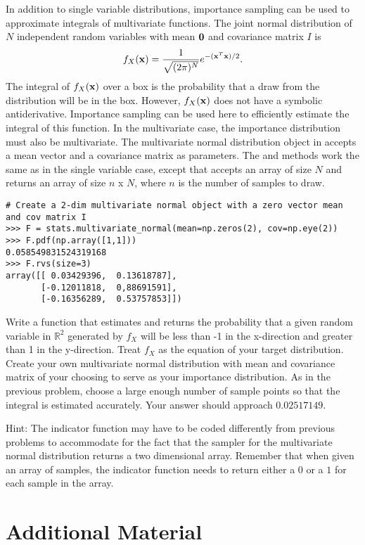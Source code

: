 In addition to single variable distributions, importance sampling can be used to approximate integrals of multivariate functions.
The joint normal distribution of $N$ independent random variables with mean $\mathbf{0}$ and covariance matrix $I$ is
\[
f_X(\mathbf{x}) = \frac{1}{\sqrt{(2 \pi)^N}} e^{-(\mathbf{x}^T\mathbf{x})/2}.
\]
The integral of $f_X(\mathbf{x})$ over a box is the probability that a draw from the distribution will be in the box.
However, $f_X(\mathbf{x})$ does not have a symbolic antiderivative.
Importance sampling can be used here to efficiently estimate the integral of this function.
In the multivariate case, the importance distribution must also be multivariate.
The multivariate normal distribution object in  accepts a mean vector and a covariance matrix as parameters.
The  and  methods work the same as in the single variable case, except that  accepts an array of size $N$ and  returns an array of size $n$ x $N$, where $n$ is the number of samples to draw.
\begin{lstlisting}
# Create a 2-dim multivariate normal object with a zero vector mean and cov matrix I
>>> F = stats.multivariate_normal(mean=np.zeros(2), cov=np.eye(2))
>>> F.pdf(np.array([1,1]))
0.058549831524319168
>>> F.rvs(size=3)
array([[ 0.03429396,  0.13618787],
       [-0.12011818,  0,88691591],
       [-0.16356289,  0.53757853]])
\end{lstlisting}

\begin{problem}
Write a function that estimates and returns the probability that a given random variable in $\mathbb{R}^2$ generated by $f_X$ will be less than -1 in the x-direction and greater than 1 in the y-direction.
Treat $f_X$ as the equation of your target distribution.
Create your own multivariate normal distribution with mean and covariance matrix of your choosing to serve as your importance distribution.
As in the previous problem, choose a large enough number of sample points so that the integral is estimated accurately.
Your answer should approach $0.02517149$.

Hint: The indicator function may have to be coded differently from previous problems to accommodate for the fact that the sampler for the multivariate normal distribution returns a two dimensional array.
Remember that when given an array of samples, the indicator function needs to return either a $0$ or a $1$ for each sample in the array.
\end{problem}

\newpage
\section*{Additional Material}

